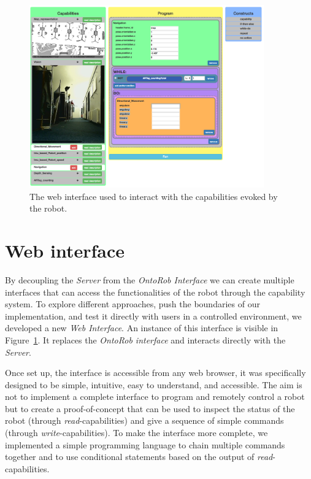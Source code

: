 \begin{figure}[t]
    \centering
    \includegraphics[width=0.9\textwidth]{gfx/onto/web}
    \caption{The web interface used to interact with the capabilities evoked by the robot.}\label{fig:web-api}
\end{figure}

\section{Web interface}
By decoupling the \textit{Server} from the \textit{OntoRob Interface} we can create multiple interfaces that can access the functionalities of the robot through the capability system. To explore different approaches, push the boundaries of our implementation, and test it directly with users in a controlled environment, we developed a new \textit{Web Interface}. An instance of this interface is visible in Figure~\ref{fig:web-api}. It replaces the \textit{OntoRob interface} and interacts directly with the \textit{Server}.

Once set up, the interface is accessible from any web browser, it was specifically designed to be simple, intuitive, easy to understand, and accessible. The aim is not to implement a complete interface to program and remotely control a robot but to create a proof-of-concept that can be used to inspect the status of the robot (through \textit{read}-capabilities) and give a sequence of simple commands (through \textit{write}-capabilities). To make the interface more complete, we implemented a simple programming language to chain multiple commands together and to use conditional statements based on the output of \textit{read}-capabilities.

